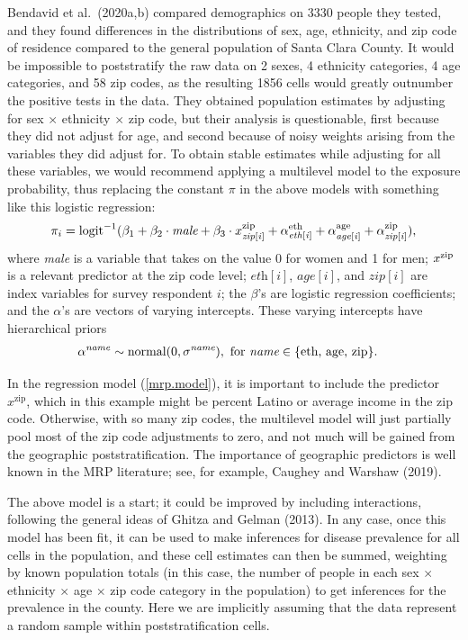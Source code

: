 \documentclass[11pt]{article}
\begin{document}
Bendavid et al.\ (2020a,b) compared demographics on 3330 people they tested, and they found differences in the distributions of sex, age, ethnicity, and zip code of residence compared to the general population of Santa Clara County. It would be impossible to poststratify the raw data on 2 sexes, 4 ethnicity categories,  4 age categories, and 58 zip codes, as the resulting 1856 cells would greatly outnumber the positive tests in the data.  They obtained population estimates by adjusting for sex $\times$ ethnicity $\times$ zip code, but their analysis is questionable, first because they did not adjust for age, and second because of noisy weights arising from the variables they did adjust for.
To obtain stable estimates while adjusting for all these variables, we would recommend applying a multilevel model to the exposure probability, thus replacing the constant $\pi$ in the above models with something like this logistic regression:
\begin{equation}\label{mrp.model}
\pi_i = \mbox{logit}^{-1}(\beta_1 + \beta_2 \cdot \mbox{\it male} + \beta_3 \cdot x^{\textrm{zip}}_{\it zip[i]} + \alpha^{\textrm{eth}}_{\it eth[i]} + \alpha^{\textrm{age}}_{\it age[i]} + \alpha^{\textrm{zip}}_{\it zip[i]}),
\end{equation}
where {\it male} is a variable that takes on the value 0 for women and 1 for men; $x^{\rm zip}$ is a relevant predictor at the zip code level; $\textit{eth}[i]$, $\textit{age}[i]$, and $\textit{zip}[i]$ are index variables for survey respondent $i$; the $\beta$'s are logistic regression coefficients; and the $\alpha$'s are vectors of varying intercepts.  These varying intercepts have hierarchical priors
\begin{align*}
  \alpha^{\it name} &\sim \mbox{normal}(0, \sigma^{\textit{name}}), \ \textrm{for} \ \textit{name} \in \{ \textrm{eth, age, zip} \}.
\end{align*}

In the regression model (\ref{mrp.model}), it is important to include the predictor $x^{\textrm{zip}}$, which in this example might be percent Latino or average income in the zip code.  Otherwise, with so many zip codes, the multilevel model will just partially pool most of the zip code adjustments to zero, and not much will be gained from the geographic poststratification.  The importance of geographic predictors is well known in the MRP literature; see, for example, Caughey and Warshaw (2019).

The above model is a start; it could be improved by including interactions, following the general ideas of Ghitza and Gelman (2013).  In any case, once this model has been fit, it can be used to make inferences for disease prevalence for all cells in the population, and these cell estimates can then be summed, weighting by known population totals (in this case, the number of people in each sex $\times$ ethnicity $\times$ age $\times$ zip code category in the population) to get inferences for the prevalence in the county.  Here we are implicitly assuming that the data represent a random sample within poststratification cells.
\end{document}
